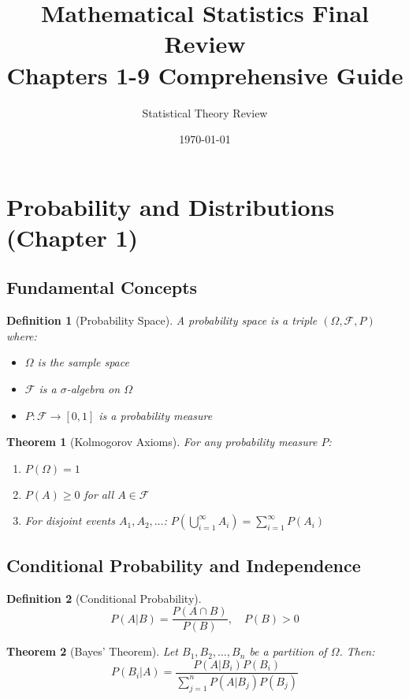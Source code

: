 \documentclass[12pt,a4paper]{amsart}
\title{\textbf{Mathematical Statistics Final Review\\Chapters 1-9 Comprehensive Guide}}
\author{Statistical Theory Review}
\date{\today}
\newtheorem{theorem}{Theorem}[section]
\newtheorem{definition}{Definition}[section]
\theoremstyle{remark}
\begin{document}
\maketitle
\tableofcontents
\newpage

\section{Probability and Distributions (Chapter 1)}

\subsection{Fundamental Concepts}

\begin{definition}[Probability Space]
A probability space is a triple $(\Omega, \mathcal{F}, P)$ where:
\begin{itemize}
\item $\Omega$ is the sample space
\item $\mathcal{F}$ is a $\sigma$-algebra on $\Omega$
\item $P: \mathcal{F} \to [0,1]$ is a probability measure
\end{itemize}
\end{definition}

\begin{theorem}[Kolmogorov Axioms]
For any probability measure $P$:
\begin{enumerate}
\item $P(\Omega) = 1$
\item $P(A) \geq 0$ for all $A \in \mathcal{F}$
\item For disjoint events $A_1, A_2, \ldots$: $P(\bigcup_{i=1}^{\infty} A_i) = \sum_{i=1}^{\infty} P(A_i)$
\end{enumerate}
\end{theorem}

\subsection{Conditional Probability and Independence}

\begin{definition}[Conditional Probability]
$$P(A|B) = \frac{P(A \cap B)}{P(B)}, \quad P(B) > 0$$
\end{definition}

\begin{theorem}[Bayes' Theorem]
Let $B_1, B_2, \ldots, B_n$ be a partition of $\Omega$. Then:
$$P(B_i|A) = \frac{P(A|B_i)P(B_i)}{\sum_{j=1}^n P(A|B_j)P(B_j)}$$
\end{theorem}
\end{document}

